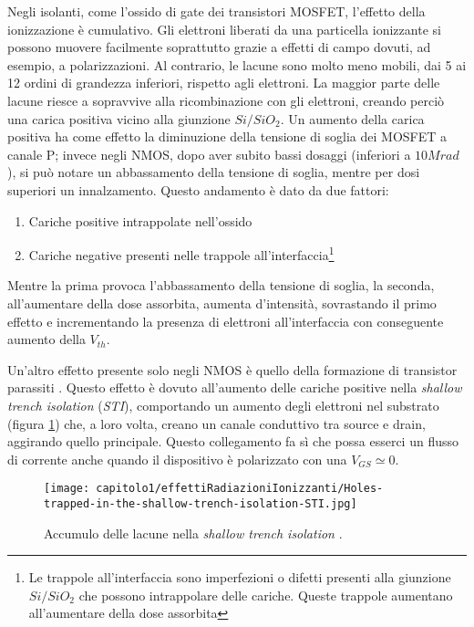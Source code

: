 \vspace{0.5cm}

Negli isolanti, come l'ossido di gate dei transistori MOSFET, l'effetto della ionizzazione è cumulativo. Gli elettroni liberati da una particella ionizzante si possono muovere facilmente soprattutto grazie a effetti di campo dovuti, ad esempio, a polarizzazioni.
Al contrario, le lacune sono molto meno mobili, dai 5 ai 12 ordini di grandezza inferiori, rispetto agli elettroni. La maggior parte delle lacune riesce a sopravvive alla ricombinazione con gli elettroni, creando perciò una carica positiva vicino alla giunzione $Si/SiO_2$. Un aumento della carica positiva ha come effetto la diminuzione della tensione di soglia dei MOSFET a canale P; invece negli NMOS, dopo aver subito bassi dosaggi (inferiori a $10Mrad$), si può notare un abbassamento della tensione di soglia, mentre per dosi superiori un innalzamento. Questo andamento è dato da due fattori:
\begin{enumerate}
	\item Cariche positive intrappolate nell'ossido
	\item Cariche negative presenti nelle trappole all'interfaccia\footnote{Le trappole all'interfaccia sono imperfezioni o difetti presenti alla giunzione $Si/SiO_2$ che possono intrappolare delle cariche. Queste trappole aumentano all'aumentare della dose assorbita}
\end{enumerate}
Mentre la prima provoca l'abbassamento della tensione di soglia, la seconda, all'aumentare della dose assorbita, aumenta d'intensità, sovrastando il primo effetto e incrementando la presenza di elettroni all'interfaccia con conseguente aumento della $V_{th}$.  

\vspace{0.5cm}

Un'altro effetto presente solo negli NMOS è quello della formazione di transistor parassiti \cite{effetti_radiazioni:CMOS_IC_radiation_hardening_by_design}. Questo effetto è dovuto all'aumento delle cariche positive nella \textit{shallow trench isolation} (\textit{STI}), comportando un aumento degli elettroni nel substrato (figura \ref{fig:accumulo_lacune_STI}) che, a loro volta, creano un canale conduttivo tra source e drain, aggirando quello principale. Questo collegamento fa sì che possa esserci un flusso di corrente anche quando il dispositivo è polarizzato con una $V_{GS} \simeq 0$.

\begin{figure}[ht]
	\centering

	\texttt{[image: capitolo1/effettiRadiazioniIonizzanti/Holes-trapped-in-the-shallow-trench-isolation-STI.jpg]}

	\caption[Lacune nella \textit{STI}]{Accumulo delle lacune nella \textit{shallow trench isolation} \cite{effetti_radiazioni:CMOS_IC_radiation_hardening_by_design}.}
	\label{fig:accumulo_lacune_STI}

\end{figure}

